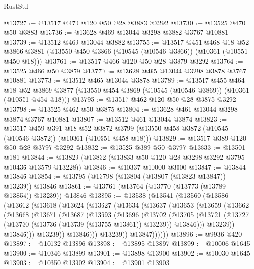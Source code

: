 \begin{lexlean}{RustStd}
\begin{coremodule}
@13727 := @13517 @470 @120 @50 @28 @3883 @3292
@13730 := @13525 @470 @50 @3883
@13736 := @13628 @469 @13044 @3298 @3882 @3767 @10881
@13739 := @13512 @469 @13044 @3882
@13755 := @13517
    @451
    @468
    @18
    @52
    @3866
    @3881
    (@13550 @450 @3866 (@10545 (@10546 @3866)) (@10361 (@10551 @450 @18)))
@13761 := @13517 @466 @120 @50 @28 @3879 @3292
@13764 := @13525 @466 @50 @3879
@13770 := @13628 @465 @13044 @3298 @3878 @3767 @10881
@13773 := @13512 @465 @13044 @3878
@13789 := @13517
    @455
    @464
    @18
    @52
    @3869
    @3877
    (@13550 @454 @3869 (@10545 (@10546 @3869)) (@10361 (@10551 @454 @18)))
@13795 := @13517 @462 @120 @50 @28 @3875 @3292
@13798 := @13525 @462 @50 @3875
@13804 := @13628 @461 @13044 @3298 @3874 @3767 @10881
@13807 := @13512 @461 @13044 @3874
@13823 := @13517
    @459
    @391
    @18
    @52
    @3872
    @3799
    (@13550 @458 @3872 (@10545 (@10546 @3872)) (@10361 (@10551 @458 @18)))
@13829 := @13517 @389 @120 @50 @28 @3797 @3292
@13832 := @13525 @389 @50 @3797
@13833 := @13501 @181
@13844 := @13829 (@13832 (@13833 @50 @120 @28 @3298 @3292 @3795 @10436 @13579 @13228))
@13846 := @10337 @10000 @3000
@13847 := @13844 @13846
@13854 := @13795 (@13798 (@13804 (@13807 (@13823 @13847)) @13239)) @13846
@13861 := @13761 (@13764 (@13770 (@13773 (@13789 @13854)) @13239)) @13846
@13895 := @13538
    (@13541
      (@13560
        (@13586
          (@13602
            (@13618
              (@13624
                (@13627
                  (@13634
                    (@13637
                      (@13653
                        (@13659
                          (@13662
                            (@13668
                              (@13671
                                (@13687
                                  (@13693
                                    (@13696
                                      (@13702
                                        (@13705
                                          (@13721
                                            (@13727
                                              (@13730 (@13736 (@13739 (@13755 @13861)) @13239))
                                              @13846)))
                                        @13239))
                                    @13846)))
                              @13239))
                          @13846)))
                    @13239))
                @13847))))))
@13896 := @9936 @420
@13897 := @10132 @13896
@13898 := @13895 @13897
@13899 := @10006 @1645
@13900 := @10346 @13899
@13901 := @13898 @13900
@13902 := @10030 @1645
@13903 := @10350 @13902
@13904 := @13901 @13903

\end{coremodule}
\end{lexlean}
